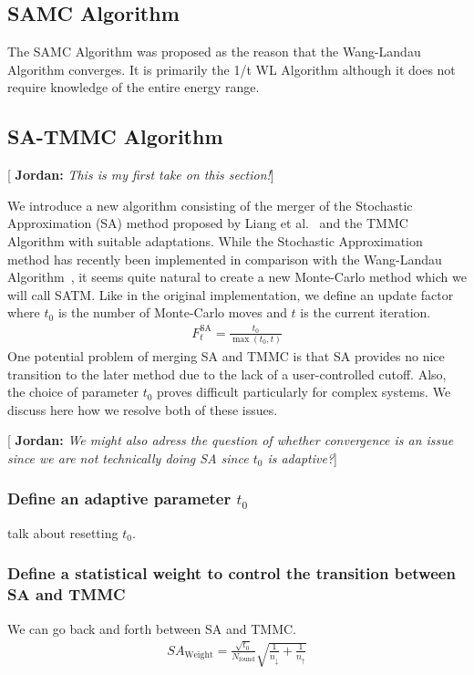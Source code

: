\documentclass[letterpaper,twocolumn,amsmath,amssymb,pre,aps,10pt]{revtex4-1}
\newcommand{\blue}[1]{{\bf \color{blue} #1}}
\newcommand{\jpsays}[1]{{\color{red} [\blue{Jordan:} \emph{#1}]}}
\begin{document}
\subsection{SAMC Algorithm}
The SAMC Algorithm was proposed as the reason that the Wang-Landau Algorithm converges.  It is primarily the 1/t WL Algorithm although it does not require knowledge of the entire energy range.


\subsection{SA-TMMC Algorithm}
\jpsays{This is my first take on this section!}

We introduce a new algorithm consisting of the merger of the Stochastic Approximation (SA) method proposed by Liang et al.~\cite{liang2007stochastic} and the TMMC Algorithm with suitable adaptations.  While the Stochastic Approximation method has recently been implemented in comparison with the Wang-Landau Algorithm~\cite{werlich2015stochastic, schneider2017convergence}, it seems quite natural to create a new Monte-Carlo method which we will call SATM.  Like in the original implementation, we define an update factor where $t_0$ is the number of Monte-Carlo moves and $t$ is the current iteration.  
\begin{align}
F_{t}^{\text{SA}} = \frac{t_0}{\max(t_0,t)}
\end{align}
One potential problem of merging SA and TMMC is that SA provides no nice transition to the later method due to the lack of a user-controlled cutoff.  Also, the choice of parameter $t_0$ proves difficult particularly for complex systems.  We discuss here how we resolve both of these issues. 

\jpsays{We might also adress the question of whether convergence is an issue since we are not technically doing SA since $t_0$ is adaptive?}

\subsubsection{Define an adaptive parameter $t_0$}
talk about resetting $t_0$.

\subsubsection{Define a statistical weight to control the transition between SA and TMMC}
We can go back and forth between SA and TMMC.
\begin{align}
SA_{\text{Weight}} =\frac{\sqrt{t_0}}{N_\text{found}} 
\sqrt{\frac{1}{n_\downarrow}+\frac{1}{n_\uparrow}}
\end{align}
\end{document}
